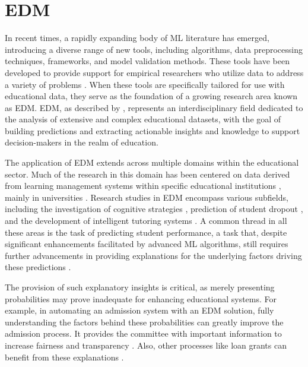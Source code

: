 \section{EDM}

In recent times, a rapidly expanding body of \gls{ML} literature has emerged, introducing a diverse range of new tools, including algorithms, data preprocessing techniques, frameworks, and model validation methods. These tools have been developed to provide support for empirical researchers who utilize data to address a variety of problems \cite{Athey2019MachineAbout}. When these tools are specifically tailored for use with educational data, they serve as the foundation of a growing research area known as \gls{EDM}. \gls{EDM}, as described by \cite{Romero2020EducationalSurvey}, represents an interdisciplinary field dedicated to the analysis of extensive and complex educational datasets, with the goal of building predictions and extracting actionable insights and knowledge to support decision-makers in the realm of education.

The application of \gls{EDM} extends across multiple domains within the educational sector. Much of the research in this domain has been centered on data derived from learning management systems within specific educational institutions \cite{Fischer2020MiningChallenges}, mainly in universities \cite{Romero2020EducationalSurvey}. Research studies in \gls{EDM} encompass various subfields, including the investigation of cognitive strategies \cite{Fancsali2018IntelligentOffs, Moussavi2016TheTopics}, prediction of student dropout \cite{Chaturapruek2018HowGPA, Jayaprakash2014EarlyInitiative}, and the development of intelligent tutoring systems \cite{Jiang2019Goal-basedRecommendation}. A common thread in all these areas is the task of predicting student performance, a task that, despite significant enhancements facilitated by advanced ML algorithms, still requires further advancements in providing explanations for the underlying factors driving these predictions \cite{Yang2021InterpretabilityLearning, Kovalev2020EducationalSolutions}.

The provision of such explanatory insights is critical, as merely presenting probabilities may prove inadequate for enhancing educational systems. For example, in automating an admission system with an \gls{EDM} solution, fully understanding the factors behind these probabilities can greatly improve the admission process. It provides the committee with important information to increase fairness and transparency \cite{AlGhamdi2020APrediction, Maulana2023OptimizingPerspective}. Also, other processes like loan grants can benefit from these explanations \cite{Maulana2023OptimizingPerspective}.

